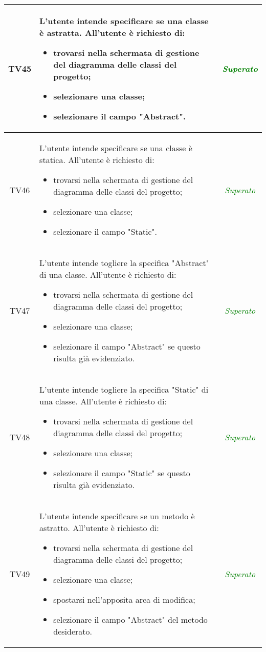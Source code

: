 \begin{longtable}{|c|>{}m{8cm}|c|}
\hypertarget{TV3.1.8}{TV45} & L'utente intende specificare se una classe è astratta.
All'utente è richiesto di:
\begin{itemize}
	\item trovarsi nella schermata di gestione del diagramma delle classi del progetto;
	\item selezionare una classe;
	\item selezionare il campo "Abstract".
\end{itemize} & \textcolor{Green}{\textit{Superato}}\\ \hline


\hypertarget{TV3.1.8}{TV46} & L'utente intende specificare se una classe è statica.
All'utente è richiesto di:
\begin{itemize}
	\item trovarsi nella schermata di gestione del diagramma delle classi del progetto;
	\item selezionare una classe;
	\item selezionare il campo "Static".
\end{itemize} & \textcolor{Green}{\textit{Superato}}\\ \hline

\hypertarget{TV3.1.10}{TV47} & L'utente intende togliere la specifica "Abstract" di una classe.
All'utente è richiesto di:
\begin{itemize}
	\item trovarsi nella schermata di gestione del diagramma delle classi del progetto;
	\item selezionare una classe;
	\item selezionare il campo "Abstract" se questo risulta già evidenziato.
\end{itemize} & \textcolor{Green}{\textit{Superato}}\\ \hline

\hypertarget{TV3.1.11}{TV48} & L'utente intende togliere la specifica "Static" di una classe.
All'utente è richiesto di:
\begin{itemize}
	\item trovarsi nella schermata di gestione del diagramma delle classi del progetto;
	\item selezionare una classe;
	\item selezionare il campo "Static" se questo risulta già evidenziato.
\end{itemize} & \textcolor{Green}{\textit{Superato}}\\ \hline

\hypertarget{TV3.1.12}{TV49} & L'utente intende specificare se un metodo è astratto.
All'utente è richiesto di:
\begin{itemize}
	\item trovarsi nella schermata di gestione del diagramma delle classi del progetto;
	\item selezionare una classe;
	\item spostarsi nell'apposita area di modifica;
	\item selezionare il campo "Abstract" del metodo desiderato.
\end{itemize} & \textcolor{Green}{\textit{Superato}}\\ \hline


\end{longtable}
